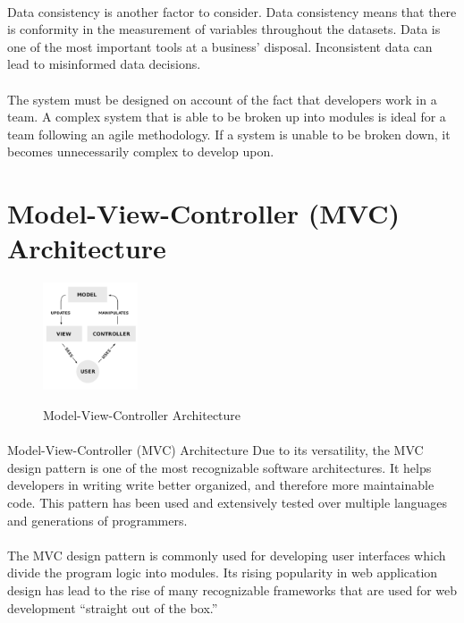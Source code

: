 \documentclass{turabian-researchpaper}
\begin{document}
\paragraph{}
Data consistency is another factor to consider. 
Data consistency means that there is conformity in the measurement of variables throughout the datasets.\cite{wikipedia_2018}
Data is one of the most important tools at a business’ disposal.\cite{import.io_2019} Inconsistent data can lead to misinformed data decisions. 
\par
\paragraph{}
The system must be designed on account of the fact that developers work in a team. A complex system that is able to be broken up into modules is ideal for a team following an agile methodology. If a system is unable to be broken down, it becomes unnecessarily complex to develop upon.
\par
\endsection

\clearpage
\section{Model-View-Controller (MVC) Architecture}
\begin{figure}
\centering
\includegraphics[width=0.25\textwidth]{pics/mvc.png}
\caption{Model-View-Controller Architecture}\cite{wikipedia_2020}
\end{figure}
\paragraph{}
Model-View-Controller (MVC) Architecture
Due to its versatility, the MVC design pattern is one of the most recognizable software architectures. It helps developers in writing write better organized, and therefore more maintainable code. This pattern has been used and extensively tested over multiple languages and generations of programmers. \cite{chrome}
\par
\paragraph{}
The MVC design pattern is commonly used for developing user interfaces which divide the program logic into modules.
\cite{wikipedia_2020}
Its rising popularity in web application design has lead to the rise of many recognizable frameworks that are used for web development “straight out of the box.” \cite{microsoft}
\par
\end{document}
